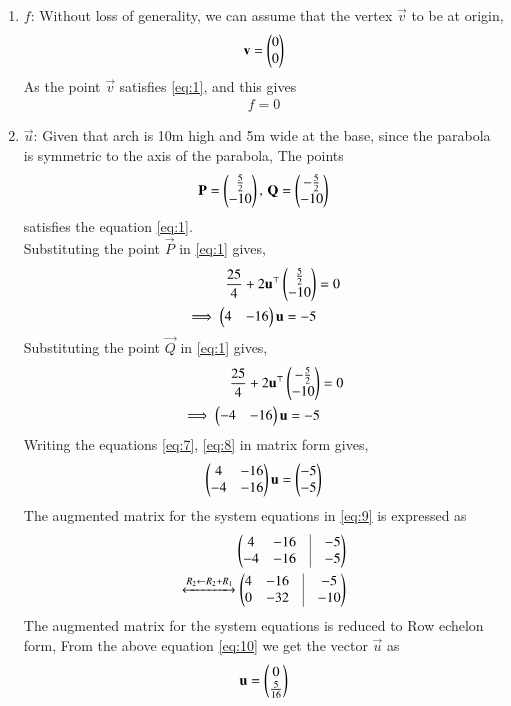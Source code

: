 \documentclass[journal,12pt,twocolumn]{IEEEtran}
\begin{document}
\begin{enumerate}
\begin{enumerate}
\item $f$: Without loss of generality, we can assume that the vertex $\vec{v}$ to be at origin,
\begin{align}
\mathbf{v} = \begin{pmatrix}0\\0\end{pmatrix}
\end{align}
As the point $\vec{v}$ satisfies \eqref{eq:1}, and this gives
\begin{align}
f = 0
\end{align}
\item $\vec{u}$: Given that arch is 10m high and 5m wide at the base, since the parabola is symmetric to the axis of the parabola, The points
\begin{align}
\mathbf{P} = \begin{pmatrix}\frac{5}{2}\\ -10\end{pmatrix}, \, \mathbf{Q} = \begin{pmatrix}-	\frac{5}{2}\\ -10\end{pmatrix}
\end{align}
satisfies the equation \eqref{eq:1}. \\
Substituting the point $\vec{P}$ in \eqref{eq:1} gives,
\begin{align}
\frac{25}{4} + 2\mathbf{u}^\top \begin{pmatrix}\frac{5}{2}\\ -10\end{pmatrix} &= 0\\
\implies \begin{pmatrix}4&-16\end{pmatrix}\mathbf{u} = -5\label{eq:7}
\end{align}
Substituting the point $\vec{Q}$ in \eqref{eq:1} gives,
\begin{align}
\frac{25}{4} + 2\mathbf{u}^\top \begin{pmatrix}-\frac{5}{2}\\ -10\end{pmatrix} &= 0\\
\implies \begin{pmatrix}-4&-16\end{pmatrix}\mathbf{u} = -5\label{eq:8}
\end{align}
Writing the equations \eqref{eq:7}, \eqref{eq:8} in matrix form gives,
\begin{align}
\begin{pmatrix}4&-16\\-4&-16\end{pmatrix}\mathbf{u} = \begin{pmatrix}-5\\-5\end{pmatrix}\label{eq:9}
\end{align}
The augmented matrix for the system equations in \eqref{eq:9} is expressed as
\begin{align}
	\myvec{4&-16&\vrule&-5\\ -4&-16&\vrule&-5} \\
	\xleftrightarrow[]{R_2\leftarrow R_2+R_1}
	\myvec{4&-16&\vrule&-5\\ 0&-32&\vrule&-10} \label{eq:10}
\end{align}
The augmented matrix for the system equations is reduced to Row echelon form, From the above equation \eqref{eq:10} we get the vector $\vec{u}$ as
\begin{align}
\mathbf{u} = \begin{pmatrix}0\\\frac{5}{16}\end{pmatrix}
\end{align}
\end{enumerate}


\end{enumerate}
\end{document}
